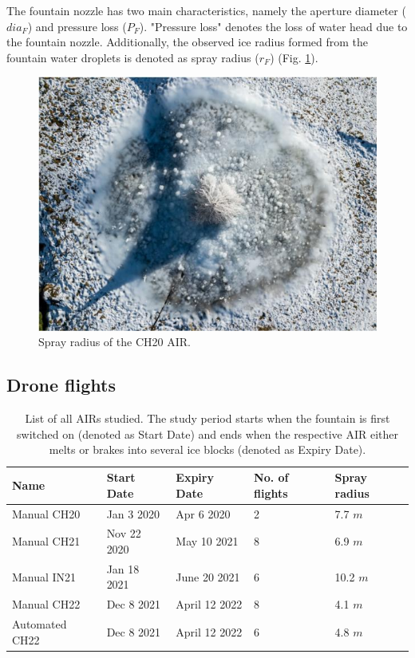 The fountain nozzle has two main characteristics, namely the aperture diameter ($dia_{F}$) and pressure loss
($P_{F}$). "Pressure loss" denotes the loss of water head due to the fountain nozzle. Additionally,
the observed ice radius formed from the fountain water droplets is denoted as spray radius ($r_F$) (Fig.
\ref{fig:CH20_rad}).

\begin{figure}[htb]
	\centering
	\includegraphics[width=\textwidth/2]{figs/CH20_sprayrad.jpg}
	\caption{Spray radius of the CH20 \ac{AIR}. }
	\label{fig:CH20_rad}
\end{figure}

\subsection{Drone flights}

\begin{table}
	\centering
	\caption{List of all \ac{AIRs} studied. The study period starts when the fountain is first switched on
		(denoted as Start Date) and ends when the respective \ac{AIR} either melts or brakes into several ice blocks
		(denoted as Expiry Date). }
	\label{tab:AIRs}
	\begin{tabular}{|lllll|}
		\hline
		\textbf{Name}    & \textbf{Start Date} & \textbf{Expiry Date} & \textbf{No. of flights} & \textbf{Spray
		radius}                                                                                                 \\ \hline
		Manual CH20 & Jan 3 2020          & Apr 6 2020           & 2                       & 7.7 $m$       \\
		Manual CH21 & Nov 22 2020         & May 10 2021          & 8                       & 6.9 $m$       \\
		Manual IN21 & Jan 18 2021         & June 20 2021         & 6                       & 10.2 $m$      \\
		Manual CH22 & Dec 8 2021          & April 12 2022        & 8                       & 4.1 $m$       \\
		Automated CH22   & Dec 8 2021          & April 12 2022        & 6                       & 4.8 $m$       \\ \hline
	\end{tabular}
\end{table}

